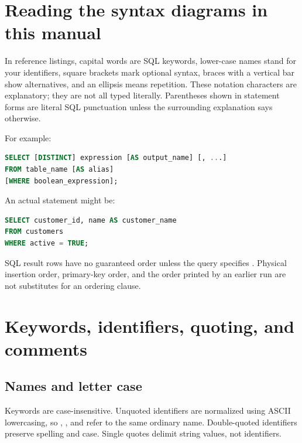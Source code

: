 
\section{Reading the syntax diagrams in this manual}

In reference listings, capital words are SQL keywords, lower-case names stand for your identifiers, square brackets mark optional syntax, braces with a vertical bar show alternatives, and an ellipsis means repetition. These notation characters are explanatory; they are not all typed literally. Parentheses shown in statement forms are literal SQL punctuation unless the surrounding explanation says otherwise.

For example:

\begin{lstlisting}[language=SQL]
SELECT [DISTINCT] expression [AS output_name] [, ...]
FROM table_name [AS alias]
[WHERE boolean_expression];
\end{lstlisting}

An actual statement might be:

\begin{lstlisting}[language=SQL]
SELECT customer_id, name AS customer_name
FROM customers
WHERE active = TRUE;
\end{lstlisting}

SQL result rows have no guaranteed order unless the query specifies . Physical insertion order, primary-key order, and the order printed by an earlier run are not substitutes for an ordering clause.

\section{Keywords, identifiers, quoting, and comments}

\subsection{Names and letter case}

Keywords are case-insensitive. Unquoted identifiers are normalized using ASCII lowercasing, so , , and  refer to the same ordinary name. Double-quoted identifiers preserve spelling and case. Single quotes delimit string values, not identifiers.

